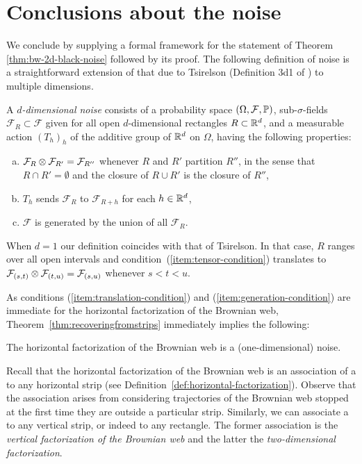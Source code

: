 {
\section{Conclusions about the noise}
\label{sec:conclusions-about-the-noise}

We conclude by supplying a formal framework for the statement of
Theorem \ref{thm:bw-2d-black-noise} followed by its proof.
The following definition of noise is a straightforward extension of
that due to Tsirelson (Definition
3d1 of \cite{tsirelson-nonclassical-stochastic-flows})
to multiple dimensions.

\newcommand{\F}{\mathcal{F}}
A \emph{$d$-dimensional noise} consists of a probability space $(\Omega,\F,
\P)$, sub-$\sigma$-fields $\F_R \subset \F$ given for all open
$d$-dimensional rectangles $R \subset \mathbb{R}^d$, and a measurable action
$(T_h)_h$ of the additive group of $\mathbb{R}^d$ on $\Omega$, having the following properties:

\begin{enumerate}[(a)]
\item \label{item:tensor-condition} $\F_R \tensor \F_{R'} = \F_{R''}$ whenever
$R$ and $R'$ partition $R''$, in the sense that
$R\cap R'=\emptyset$ and the closure of $R \cup R'$
is the closure of $R''$,
\item \label{item:translation-condition} $T_h$ sends $\F_R$ to $\F_{R+h}$ for each $h \in \mathbb{R}^d$,
\item \label{item:generation-condition} $\F$ is generated by the union of all $\F_R$.
\end{enumerate}

When $d = 1$ our definition coincides with that of Tsirelson.
In that case, $R$ ranges over all open intervals
and condition~(\ref{item:tensor-condition}) translates to
$\F_{(s,t)} \tensor \F_{(t,u)} = \F_{(s,u)}$ whenever $s < t < u$.

As conditions (\ref{item:translation-condition}) and
(\ref{item:generation-condition}) are immediate for
the horizontal factorization of the Brownian web,
Theorem~\ref{thm:recoveringfromstrips} immediately
implies the following:

\begin{proposition*}
The horizontal factorization of the Brownian web is a (one-dimensional)
noise.
\end{proposition*}

Recall that the horizontal factorization of the Brownian web is an
association of a \sigfield{} to any horizontal strip (see
Definition~\ref{def:horizontal-factorization}).
Observe that the association arises from considering trajectories of the Brownian
web stopped at the first time they are outside a particular strip.
Similarly, we can associate a \sigfield{} to any vertical strip, or
indeed to any rectangle.  The former association is the \emph{vertical
  factorization of the Brownian web} and the latter the
\emph{two-dimensional factorization}.

}

